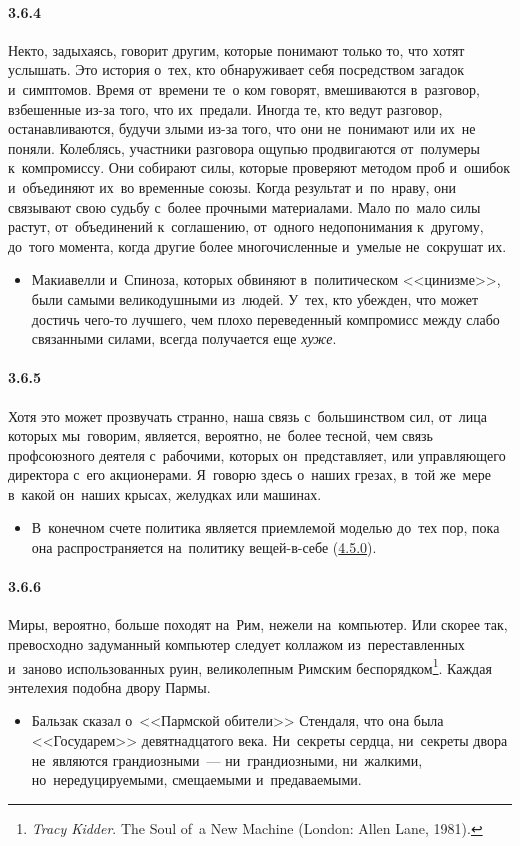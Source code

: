\paragraph{3.6.4}\hypertarget{par:3.6.4}{} Некто, задыхаясь, говорит другим, которые понимают только то, что хотят услышать. Это история о~тех, кто обнаруживает себя посредством загадок и~симптомов. Время от~времени те~о ком говорят, вмешиваются в~разговор, взбешенные из-за того, что их~предали. Иногда те, кто ведут разговор, останавливаются, будучи злыми из-за того, что они не~понимают или их~не поняли. Колеблясь, участники разговора ощупью продвигаются от~полумеры к~компромиссу. Они собирают силы, которые проверяют методом проб и~ошибок и~объединяют их~во временные союзы. Когда результат и~по~нраву, они связывают свою судьбу с~более прочными материалами. Мало по~мало силы
растут, от~объединений к~соглашению, от~одного недопонимания к~другому, до~того момента, когда другие более многочисленные и~умелые не~сокрушат их.
	\begin{itemize}
	\item 
	Макиавелли и~Спиноза, которых обвиняют в~политическом <<цинизме>>, были самыми великодушными из~людей. У~тех, кто убежден, что может достичь чего-то лучшего, чем плохо переведенный компромисс между слабо связанными силами, всегда получается еще {\itshape хуже}.
	\end{itemize}

\paragraph{3.6.5}\hypertarget{par:3.6.5}{} Хотя это может прозвучать странно, наша связь с~большинством сил, от~лица которых мы~говорим, является, вероятно, не~более тесной, чем связь профсоюзного деятеля с~рабочими, которых он~представляет, или управляющего директора с~его акционерами. Я~говорю здесь о~наших грезах, в~той же~мере в~какой он~наших крысах,
желудках или машинах. 
	\begin{itemize}
	\item 
 В~конечном счете политика является приемлемой моделью до~тех пор, пока она распространяется на~политику вещей-в-себе (\hyperlink{par:4.5.0}{4.5.0}).
	\end{itemize}

\paragraph{3.6.6}\hypertarget{par:3.6.6}{} Миры, вероятно, больше походят на~Рим, нежели на~компьютер. Или скорее так, превосходно задуманный компьютер следует коллажом из~переставленных и~заново использованных руин, великолепным Римским беспорядком\footnote{{\itshape Tracy Kidder}. The Soul of~a New Machine (London: Allen Lane, 1981).}. Каждая энтелехия подобна двору Пармы.
	\begin{itemize}
	\item 
	Бальзак сказал о~<<Пармской обители>> Стендаля, что она была <<Государем>> девятнадцатого века. Ни~секреты сердца, ни~секреты двора не~являются грандиозными~--- ни~грандиозными, ни~жалкими, но~нередуцируемыми, смещаемыми и~предаваемыми.	
	\end{itemize}	